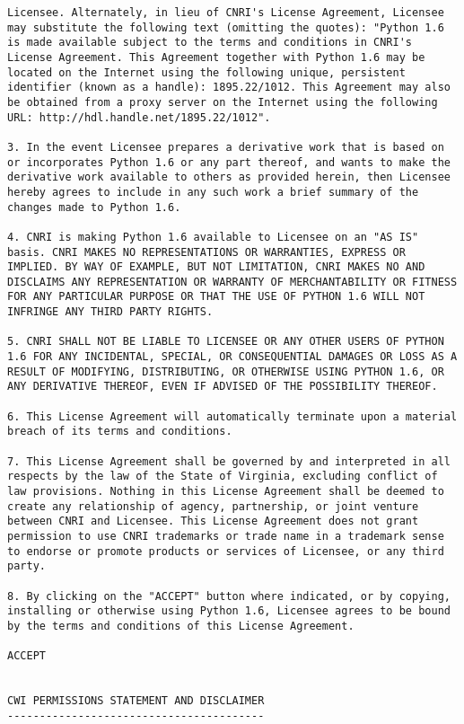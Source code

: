 \begin{verbatim}
Licensee. Alternately, in lieu of CNRI's License Agreement, Licensee
may substitute the following text (omitting the quotes): "Python 1.6
is made available subject to the terms and conditions in CNRI's
License Agreement. This Agreement together with Python 1.6 may be
located on the Internet using the following unique, persistent
identifier (known as a handle): 1895.22/1012. This Agreement may also
be obtained from a proxy server on the Internet using the following
URL: http://hdl.handle.net/1895.22/1012".

3. In the event Licensee prepares a derivative work that is based on
or incorporates Python 1.6 or any part thereof, and wants to make the
derivative work available to others as provided herein, then Licensee
hereby agrees to include in any such work a brief summary of the
changes made to Python 1.6.

4. CNRI is making Python 1.6 available to Licensee on an "AS IS"
basis. CNRI MAKES NO REPRESENTATIONS OR WARRANTIES, EXPRESS OR
IMPLIED. BY WAY OF EXAMPLE, BUT NOT LIMITATION, CNRI MAKES NO AND
DISCLAIMS ANY REPRESENTATION OR WARRANTY OF MERCHANTABILITY OR FITNESS
FOR ANY PARTICULAR PURPOSE OR THAT THE USE OF PYTHON 1.6 WILL NOT
INFRINGE ANY THIRD PARTY RIGHTS.

5. CNRI SHALL NOT BE LIABLE TO LICENSEE OR ANY OTHER USERS OF PYTHON
1.6 FOR ANY INCIDENTAL, SPECIAL, OR CONSEQUENTIAL DAMAGES OR LOSS AS A
RESULT OF MODIFYING, DISTRIBUTING, OR OTHERWISE USING PYTHON 1.6, OR
ANY DERIVATIVE THEREOF, EVEN IF ADVISED OF THE POSSIBILITY THEREOF.

6. This License Agreement will automatically terminate upon a material
breach of its terms and conditions.

7. This License Agreement shall be governed by and interpreted in all
respects by the law of the State of Virginia, excluding conflict of
law provisions. Nothing in this License Agreement shall be deemed to
create any relationship of agency, partnership, or joint venture
between CNRI and Licensee. This License Agreement does not grant
permission to use CNRI trademarks or trade name in a trademark sense
to endorse or promote products or services of Licensee, or any third
party.

8. By clicking on the "ACCEPT" button where indicated, or by copying,
installing or otherwise using Python 1.6, Licensee agrees to be bound
by the terms and conditions of this License Agreement.

ACCEPT


CWI PERMISSIONS STATEMENT AND DISCLAIMER
----------------------------------------


\end{verbatim}
